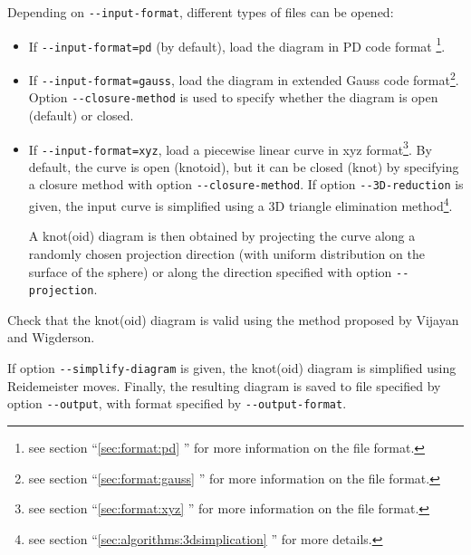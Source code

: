 Depending on \lstinline{--input-format}, different types of files can be opened:
\begin{itemize}
\item If  \lstinline{--input-format=pd} (by default), load the diagram in PD code format \footnote{see section ``\ref{sec:format:pd} ''  for more information on the file format.}.
\item If  \lstinline{--input-format=gauss}, load the diagram in extended Gauss code format\footnote{see section ``\ref{sec:format:gauss} ''  for more information on the file format.}. Option \lstinline{--closure-method} is used to specify whether the diagram is open (default) or closed.
\item If  \lstinline{--input-format=xyz}, load a piecewise linear curve in xyz format\footnote{see section ``\ref{sec:format:xyz} '' for more information on the file format.}. 
  By default, the curve is open (knotoid), but it can be closed (knot) by specifying a closure method with option \lstinline{--closure-method}.
  If option \lstinline{--3D-reduction} is given, the input curve is simplified using a 3D triangle elimination method\footnote{see section  ``\ref{sec:algorithms:3dsimplication} '' for more details.}.
  
  A knot(oid) diagram is then obtained by projecting the curve along a randomly chosen projection direction (with uniform distribution on
  the surface of the sphere) or along the direction specified with  option \lstinline{--projection}.  
\end{itemize}
Check that the knot(oid) diagram is valid using the method proposed by Vijayan and Wigderson\cite{Vijayan1982}.


If option \lstinline{--simplify-diagram} is given, the knot(oid) diagram is simplified using Reidemeister moves.
Finally, the resulting diagram is saved to file specified by option \lstinline{--output}, with format specified by \lstinline{--output-format}.

